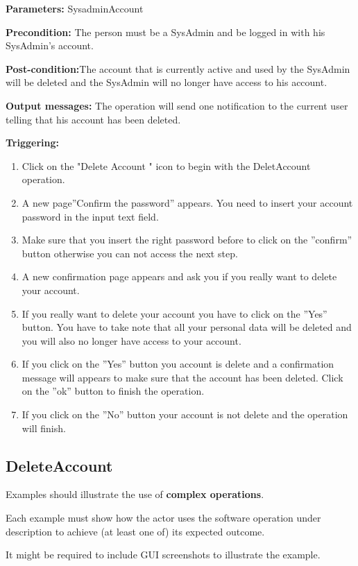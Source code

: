 \begin{description}

\item \textbf{Parameters:} SysadminAccount
\item \textbf{Precondition:} The person must be a SysAdmin and be logged in with
his SysAdmin's account.
\item \textbf{Post-condition:}The account that is currently active and used by
the SysAdmin will be deleted and the SysAdmin will no longer have access to his
account.
\item \textbf{Output messages:} The operation will send one notification to the
current user telling that his account has been deleted.


\item \textbf{Triggering:}
\begin{enumerate}
\item Click on the "Delete Account " icon to begin with the DeletAccount
operation.
\item A new page''Confirm the password'' appears. You need to insert your
account password in the input text field. 
\item Make sure that you insert the right password before to click on the
''confirm'' button otherwise you can not access the next step.
\item A new confirmation page appears and ask you if you really want to delete
your account.
\item If you really want to delete your account you have to click on the
''Yes'' button. You have to take note that all your personal data will be
deleted and you will also no longer have access to your account.
\item If you click on the ''Yes'' button you account is delete and a
confirmation message will appears to make sure that the account has been
deleted. Click on the ''ok'' button to finish the operation.
\item If you click on the ''No'' button your account is not delete and the
operation will finish.
\end{enumerate}

 
\end{description}

 
\subsection{DeleteAccount}
Examples should illustrate the use of \textbf{complex operations}.

Each example must show how the actor uses the software operation under
description to achieve (at least one of) its expected outcome.

It might be required to include GUI screenshots to illustrate the example.
